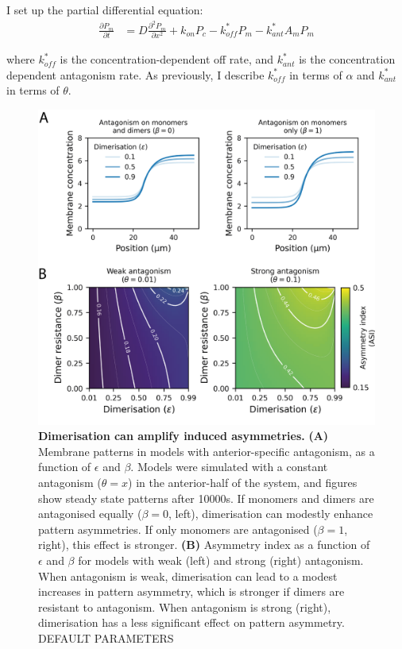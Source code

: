 \documentclass[12pt]{"report"}
\newcommand{\mycaption}[2]{\caption[#1]{\textbf{#1.} #2}}
\begin{document}
I set up the partial differential equation:
\begin{align}
\frac{\partial P_m}{\partial t} &= D \frac{\partial^2 P_m}{\partial x^2} + k_{on} P_c - k_{off}^* P_m - k_{ant}^* A_m P_m
\end{align}

where $k_{off}^*$ is the concentration-dependent off rate, and $k_{ant}^*$ is the concentration dependent antagonism rate. As previously, I describe $k_{off}^*$ in terms of $\alpha$ and $k_{ant}^*$ in terms of $\theta$.


\begin{figure}
\includegraphics[scale=1]{model_fixed_apar_asi}
\centering
\mycaption{Dimerisation can amplify induced asymmetries}{
\textbf{(A)} Membrane patterns in models with anterior-specific antagonism, as a function of $\epsilon$ and $\beta$. Models were simulated with a constant antagonism ($\theta = x$) in the anterior-half of the system, and figures show steady state patterns after 10000s. If monomers and dimers are antagonised equally ($\beta = 0$, left), dimerisation can modestly enhance pattern asymmetries. If only monomers are antagonised ($\beta = 1$, right), this effect is stronger.
\textbf{(B)} Asymmetry index as a function of $\epsilon$ and $\beta$ for models with weak (left) and strong (right) antagonism. When antagonism is weak, dimerisation can lead to a modest increases in pattern asymmetry, which is stronger if dimers are resistant to antagonism. When antagonism is strong (right), dimerisation has a less significant effect on pattern asymmetry. DEFAULT PARAMETERS
}
\label{fig:model_fixed_apar_asi}
\end{figure}
\end{document}
